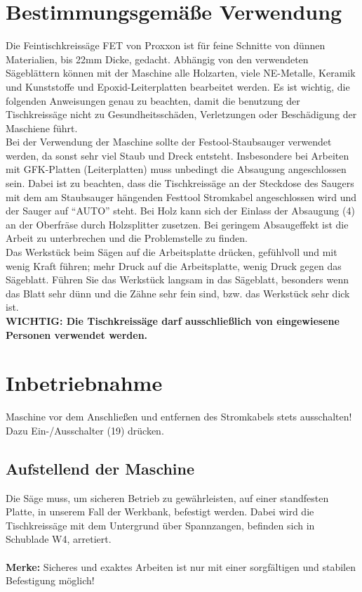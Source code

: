 \documentclass{\basedir/fablab-document}
\begin{document}
\section{Bestimmungsgemäße Verwendung}
Die Feintischkreissäge FET von Proxxon ist für feine Schnitte von dünnen Materialien, bis 22mm Dicke, gedacht. Abhängig von den verwendeten Sägeblättern können mit der Maschine alle Holzarten, viele NE-Metalle, Keramik und Kunststoffe und Epoxid-Leiterplatten bearbeitet werden. Es ist wichtig, die folgenden Anweisungen genau zu beachten, damit die benutzung der Tischkreissäge nicht zu Gesundheitsschäden, Verletzungen oder Beschädigung der Maschiene führt.\\
Bei der Verwendung der Maschine sollte  der Festool-Staubsauger verwendet werden, da sonst sehr viel Staub und Dreck entsteht. Insbesondere bei Arbeiten mit GFK-Platten (Leiterplatten) muss unbedingt die Absaugung angeschlossen sein. Dabei ist zu beachten, dass die Tischkreissäge an der Steckdose des Saugers mit dem am Staubsauger hängenden Festtool Stromkabel angeschlossen wird und der Sauger auf \enquote{AUTO} steht. Bei Holz kann sich der Einlass der Absaugung (4) an der Oberfräse durch Holzsplitter zusetzen. Bei geringem Absaugeffekt ist die Arbeit zu unterbrechen und die Problemstelle zu finden.\\
Das Werkstück beim Sägen auf die Arbeitsplatte drücken, gefühlvoll und mit wenig Kraft führen; mehr Druck auf die Arbeitsplatte, wenig Druck gegen das Sägeblatt. Führen Sie das Werkstück langsam in das Sägeblatt, besonders wenn das Blatt sehr dünn und die Zähne sehr fein sind, bzw. das Werkstück sehr dick ist. \\
\textbf{WICHTIG: Die Tischkreissäge darf ausschließlich von eingewiesene Personen verwendet werden.}


\section{Inbetriebnahme}
Maschine vor dem Anschließen und entfernen des Stromkabels stets ausschalten! Dazu Ein-/Ausschalter (19) drücken.

\subsection{Aufstellend der Maschine}
Die Säge muss, um sicheren Betrieb zu gewährleisten, auf einer standfesten Platte, in unserem Fall der Werkbank, befestigt werden. Dabei wird die Tischkreissäge mit dem Untergrund über Spannzangen, befinden sich in Schublade W4, arretiert. \\ \\
\textbf{Merke:}
Sicheres und exaktes Arbeiten ist nur mit einer sorgfältigen und stabilen Befestigung möglich!
\end{document}
